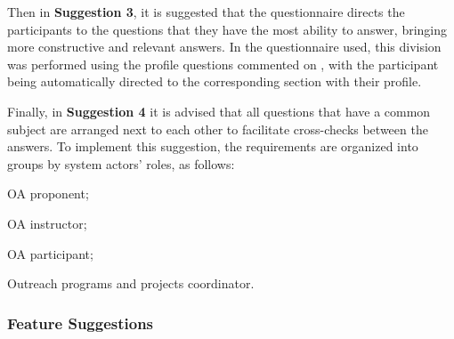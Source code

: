 Then in \textbf{Suggestion 3}, it is suggested that the questionnaire directs the participants to the questions that they have the most ability to answer, bringing more constructive and relevant answers.
In the questionnaire used, this division was performed using the profile questions commented on , with the participant being automatically directed to the corresponding section with their profile.


Finally, in \textbf{Suggestion 4} it is advised that all questions that have a common subject are arranged next to each other to facilitate cross-checks between the answers.
To implement this suggestion, the requirements are organized into groups by system actors' roles, as follows:
\begin{inparaenum}[(1)]
  \item \ac{OA} proponent;
  \item \ac{OA} instructor;
  \item \ac{OA} participant;
  \item Outreach programs and projects coordinator.
\end{inparaenum}
\subsubsection{Feature Suggestions}

